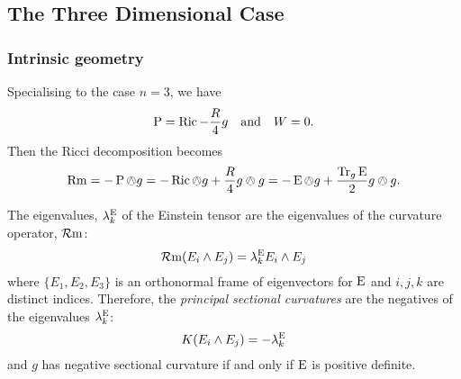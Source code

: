 \documentclass[a4paper, 12pt]{amsart}
\begin{document}
\subsection{The Three Dimensional Case}
\label{subsec:notation_threedim}

\subsubsection{Intrinsic geometry}

Specialising to the case \(n = 3\), we have
\[
\operatorname{P} = \operatorname{Ric} - \frac{R}{4} g \quad \text{and} \quad W = 0.
\]
Then the Ricci decomposition becomes
\begin{equation}
\label{eq:ricci_decomp_3d}
\operatorname{Rm} = -\operatorname{P} \owedge g = -\operatorname{Ric} \owedge g + \frac{R}{4} g \owedge g = -\operatorname{E} \owedge g + \frac{\operatorname{Tr}_g \operatorname{E}}{2} g \owedge g.
\end{equation}

\begin{lemma}
\label{lem:eins_sectional}

The eigenvalues, \(\lambda^{\operatorname{E}}_k\) of the Einstein tensor are the eigenvalues of the curvature operator, \(\operatorname{\mathcal{R}m}\):
\[
\operatorname{\mathcal{R}m}(E_i \wedge E_j) = \lambda^{\operatorname{E}}_k E_i \wedge E_j
\]
where \(\{E_1, E_2, E_3\}\) is an orthonormal frame of eigenvectors for \(\operatorname{E}\) and \(i,j,k\) are distinct indices. Therefore, the \emph{principal sectional curvatures} are the negatives of the eigenvalues \(\lambda^{\operatorname{E}}_k\):
\[
K(E_i \wedge E_j) = -\lambda^{\operatorname{E}}_k
\]
and \(g\) has negative sectional curvature if and only if \(\operatorname{E}\) is positive definite.
\end{lemma}
\end{document}

